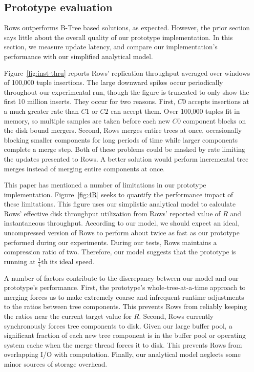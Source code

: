 \documentclass{sig-alternate-sigmod08}
\newcommand{\rows}{Rows\xspace}
\newcommand{\rowss}{Rows'\xspace}
\begin{document}

\subsection{Prototype evaluation}

\rows outperforms B-Tree based solutions, as expected.  However, the
prior section says little about the overall quality of our prototype
implementation.  In this section, we measure update latency, and
compare our implementation's performance with our simplified
analytical model.

Figure~\ref{fig:inst-thru} reports \rowss replication throughput
averaged over windows of 100,000 tuple insertions.  The large downward
spikes occur periodically throughout our experimental run, though the
figure is truncated to only show the first 10 million inserts.  They
occur for two reasons.  First, $C0$ accepts insertions at a much
greater rate than $C1$ or $C2$ can accept them.  Over 100,000 tuples
fit in memory, so multiple samples are taken before each new $C0$
component blocks on the disk bound mergers.  Second, \rows merges
entire trees at once, occasionally blocking smaller components
for long periods of time while larger components complete a merge
step.  Both of these problems could be masked by rate limiting the
updates presented to \rows.  A better solution would perform
incremental tree merges instead of merging entire components at once.

This paper has mentioned a number of limitations in our prototype
implementation.  Figure~\ref{fig:4R} seeks to quantify the performance impact of
these limitations.  This figure uses our simplistic analytical model
to calculate \rowss effective disk throughput utilization from \rowss
reported value of $R$ and instantaneous throughput.  According to our
model, we should expect an ideal, uncompressed version of \rows to
perform about twice as fast as our prototype performed during our experiments.  During our tests, \rows
maintains a compression ratio of two.  Therefore, our model suggests
that the prototype is running at $\frac{1}{4}$th its ideal speed.

A number of factors contribute to the discrepancy between our model
and our prototype's performance.  First, the prototype's
whole-tree-at-a-time approach to merging forces us to make extremely
coarse and infrequent runtime adjustments to the ratios between tree
components.  This prevents \rows from reliably keeping the ratios near
the current target value for $R$.  Second, \rows currently
synchronously forces tree components to disk.  Given our large buffer
pool, a significant fraction of each new tree component is in the
buffer pool or operating system cache when the merge thread forces it
to disk.  This prevents \rows from overlapping I/O with computation.
Finally, our analytical model neglects some minor sources of storage
overhead.
\end{document}
